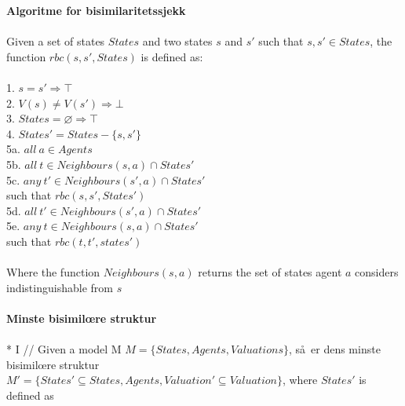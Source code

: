 \documentclass[11pt,a4paper,twosided]{article}
\begin{document}
\textbf{Algoritme for bisimilaritetssjekk}\\\\
Given a set of states $States$ and two states $s$ and $s'$ such that $s, s' \in States$, the function $rbc(s,s',States)$ is defined as:
\\
\\
1. \indent $s = s' \Rightarrow \top$ \\
2.	\indent $V(s) \neq V(s') \Rightarrow \bot$ \\
3.	\indent $States = \varnothing \Rightarrow \top$ \\
4. \indent $States' = States - \{s, s'\}$ \\
5a. \indent $all \ a \in Agents $ \\
5b. \indent\indent $all \ t \in Neighbours(s,a) \cap States'$ \\
5c. \indent\indent\indent $any \ t' \in Neighbours(s',a) \cap States'$ \\
	  \indent\indent\indent\indent  such that $rbc(s, s', States')$ \\
5d.  \indent\indent $all \ t' \in Neighbours(s',a) \cap States'$ \\
5e.  \indent\indent\indent $any \ t \in Neighbours(s,a) \cap States'$ \\
       \indent\indent\indent\indent such that $rbc(t, t', states')$ \\
\\
Where the function $Neighbours(s,a)$ returns the set of states agent $a$ considers indistinguishable from $s$\\
\\

\textbf{Minste bisimil\oe re struktur} \\\\

* I //
Given a model M $M = \{ States, Agents, Valuations \}$, s\aa \ er dens minste \\bisimil\oe re struktur \\ $M' = \{ States' \subseteq States, Agents, Valuation' \subseteq Valuation\}$, where $States'$ is defined as 
\end{document}
